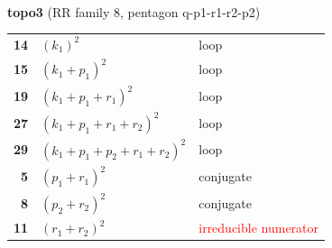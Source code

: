 \documentclass[10pt]{article}
\begin{document}
\begin{minipage}[t]{0.48\textwidth}
{}\\[2mm]\textbf{topo3} (RR family 8, pentagon q-p1-r1-r2-p2)\\[2pt]{\footnotesize\begin{tabular}{@{}r@{\ \ }l@{\ \ }l@{}}\textbf{14} & $(k_1)^2$ & loop\\
\textbf{15} & $(k_1+p_1)^2$ & loop\\
\textbf{19} & $(k_1+p_1+r_1)^2$ & loop\\
\textbf{27} & $(k_1+p_1+r_1+r_2)^2$ & loop\\
\textbf{29} & $(k_1+p_1+p_2+r_1+r_2)^2$ & loop\\
\textbf{5} & $(p_1+r_1)^2$ & conjugate\\
\textbf{8} & $(p_2+r_2)^2$ & conjugate\\
\textbf{11} & $(r_1+r_2)^2$ & \textcolor{red}{irreducible numerator}\\\end{tabular}}\end{minipage}\hfill%
\end{document}
